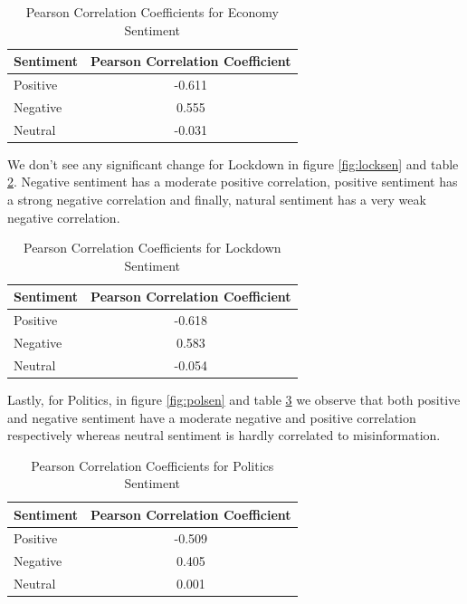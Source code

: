 \documentclass{l4proj}
\begin{document}
\begin{table}[h]
\begin{minipage}[c]{\linewidth}
\centering
\begin{tabular}{@{}ll@{}}
\toprule
Sentiment & Pearson Correlation Coefficient \\ \midrule
Positive  & \multicolumn{1}{c}{-0.611}      \\
Negative  & \multicolumn{1}{c}{0.555}       \\
Neutral   & \multicolumn{1}{c}{-0.031}       \\ \bottomrule
\end{tabular}
\caption{Pearson Correlation Coefficients for Economy Sentiment}
\label{tab:ecosen}
\end{minipage}\hfill

\end{table}

We don't see any significant change for Lockdown in figure \ref{fig:locksen} and table \ref{tab:locksen}. Negative sentiment has a moderate positive correlation, positive sentiment has a strong negative correlation and finally, natural sentiment has a very weak negative correlation.

\begin{table}[H]
\begin{minipage}[c]{\linewidth}
\centering
\begin{tabular}{@{}ll@{}}
\toprule
Sentiment & Pearson Correlation Coefficient \\ \midrule
Positive  & \multicolumn{1}{c}{-0.618}      \\
Negative  & \multicolumn{1}{c}{0.583}       \\
Neutral   & \multicolumn{1}{c}{-0.054}       \\ \bottomrule
\end{tabular}
\caption{Pearson Correlation Coefficients for Lockdown Sentiment}
\label{tab:locksen}
\end{minipage}\hfill

\end{table}

Lastly, for Politics, in figure \ref{fig:polsen} and table \ref{tab:polsen} we observe that both positive and negative sentiment have a moderate negative and positive correlation respectively whereas neutral sentiment is hardly correlated to misinformation.

\begin{table}[h]
\begin{minipage}[c]{\linewidth}
\centering
\begin{tabular}{@{}ll@{}}
\toprule
Sentiment & Pearson Correlation Coefficient \\ \midrule
Positive  & \multicolumn{1}{c}{-0.509}      \\
Negative  & \multicolumn{1}{c}{0.405}       \\
Neutral   & \multicolumn{1}{c}{0.001}       \\ \bottomrule
\end{tabular}
\caption{Pearson Correlation Coefficients for Politics Sentiment}
\label{tab:polsen}
\end{minipage}\hfill

\end{table}
\end{document}
